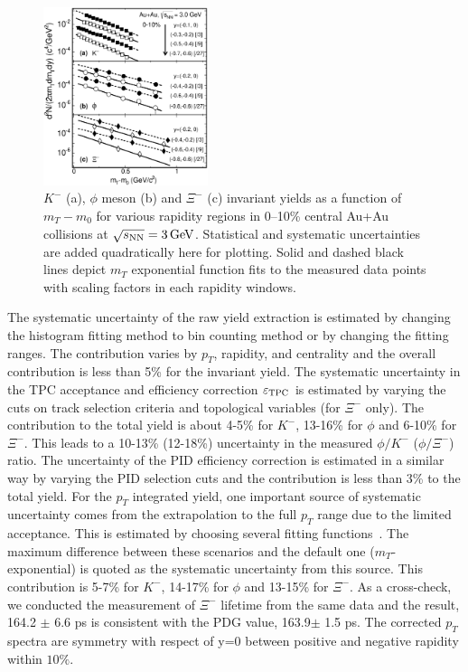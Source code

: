 \documentclass[%
 reprint,	
showpacs,
 amsmath,amssymb,
 aps,
 superscriptaddress,
]{revtex4-1}
\begin{document}
\begin{figure}
\centering
\hspace*{-4mm}
\includegraphics[width=0.43\textwidth]{fig2_h_mT_spectra_phiMeson.eps}
  \caption{$K^-$ (a), $\phi$ meson (b) and $\Xi^-$ (c) invariant yields as a function of $m_T-m_0$ for various rapidity regions in 0--10\% central Au+Au collisions at ${\sqrt{s_{\rm NN}} = \rm{3\,GeV}}$. Statistical and systematic uncertainties are added quadratically here for plotting. Solid and dashed black lines depict $m_T$ exponential function fits to the measured data points with scaling factors in each rapidity windows.}
\label{fig:phimTSpectra} 
\end{figure}

The systematic uncertainty of the raw yield extraction is estimated by changing the histogram fitting method to bin counting method or by changing the fitting ranges. The contribution varies by $p_T$, rapidity, and centrality and the overall contribution is less than 5\% for the invariant yield. The systematic uncertainty in the TPC acceptance and efficiency correction $\varepsilon_{\rm TPC}$ is estimated by varying the cuts on track selection criteria and topological variables (for $\Xi^-$ only). The contribution to the total yield is about 4-5\% for $K^-$, 13-16\% for $\phi$ and 6-10\% for $\Xi^-$. This leads to a 10-13\% (12-18\%) uncertainty in the measured $\phi/K^-$ ($\phi/\Xi^-$) ratio. The uncertainty of the PID efficiency correction is estimated in a similar way by varying the PID selection cuts and the contribution is less than 3\% to the total yield.
For the $p_T$ integrated yield, one important source of systematic uncertainty comes from the extrapolation to the full $p_T$ range due to the limited acceptance. This is estimated by choosing several fitting functions~\cite{STAR_particleYield}. The maximum difference between these scenarios and the default one ($m_T$-exponential) is quoted as the systematic uncertainty from this source. This contribution is 5-7\% for $K^-$, 14-17\% for $\phi$ and 13-15\% for $\Xi^-$. As a cross-check, we conducted the measurement of $\Xi^{-}$ lifetime from the same data and the result, 164.2 $\pm$ 6.6 ps is consistent with the PDG value, 163.9$ \pm$ 1.5 ps. The corrected $p_T$ spectra are symmetry with respect of y=0 between positive and negative rapidity within $10\%$.
\end{document}
